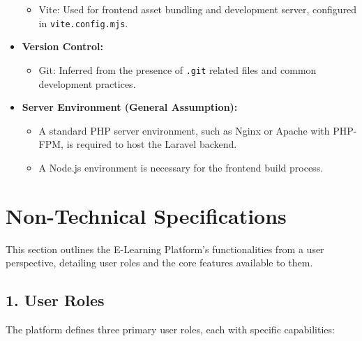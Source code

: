 \begin{itemize}
\begin{itemize}
        \item Vite: Used for frontend asset bundling and development server, configured in \texttt{vite.config.mjs}.
    \end{itemize}
    \item \textbf{Version Control:}
    \begin{itemize}
        \item Git: Inferred from the presence of \texttt{.git} related files and common development practices.
    \end{itemize}
    \item \textbf{Server Environment (General Assumption):}
    \begin{itemize}
        \item A standard PHP server environment, such as Nginx or Apache with PHP-FPM, is required to host the Laravel backend.
        \item A Node.js environment is necessary for the frontend build process.
    \end{itemize}
\end{itemize}

\section*{Non-Technical Specifications}

This section outlines the E-Learning Platform's functionalities from a user perspective, detailing user roles and the core features available to them.

\subsection*{1. User Roles}

The platform defines three primary user roles, each with specific capabilities:

